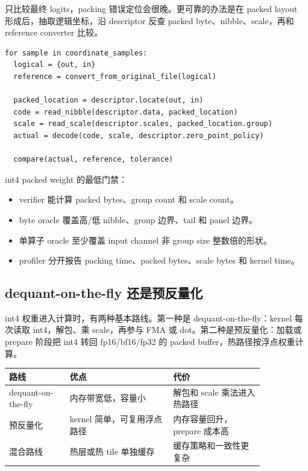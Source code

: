 只比较最终 logits，packing 错误定位会很晚。更可靠的办法是在 packed layout 形成后，抽取逻辑坐标，沿 descriptor 反查 packed byte、nibble、scale，再和 reference converter 比较。

\begin{lstlisting}[numbers=none,caption={packed int4 字节级 oracle}]
for sample in coordinate_samples:
  logical = {out, in}
  reference = convert_from_original_file(logical)

  packed_location = descriptor.locate(out, in)
  code = read_nibble(descriptor.data, packed_location)
  scale = read_scale(descriptor.scales, packed_location.group)
  actual = decode(code, scale, descriptor.zero_point_policy)

  compare(actual, reference, tolerance)
\end{lstlisting}

\begin{rubricbox}
int4 packed weight 的最低门禁：
\begin{itemize}
  \item verifier 能计算 packed bytes、group count 和 scale count。
  \item byte oracle 覆盖高/低 nibble、group 边界、tail 和 panel 边界。
  \item 单算子 oracle 至少覆盖 input channel 非 group size 整数倍的形状。
  \item profiler 分开报告 packing time、packed bytes、scale bytes 和 kernel time。
\end{itemize}
\end{rubricbox}

\subsection{dequant-on-the-fly 还是预反量化}

int4 权重进入计算时，有两种基本路线。第一种是 dequant-on-the-fly：kernel 每次读取 int4，解包、乘 scale，再参与 FMA 或 dot。第二种是预反量化：加载或 prepare 阶段把 int4 转回 fp16/bf16/fp32 的 packed buffer，热路径按浮点权重计算。

\begin{center}
\begin{tabular}{p{0.20\linewidth}p{0.34\linewidth}p{0.30\linewidth}}
\toprule
路线 & 优点 & 代价 \\
\midrule
dequant-on-the-fly & 内存带宽低，容量小 & 解包和 scale 乘法进入热路径 \\
预反量化 & kernel 简单，可复用浮点路径 & 内存容量回升，prepare 成本高 \\
混合路线 & 热层或热 tile 单独缓存 & 缓存策略和一致性更复杂 \\
\bottomrule
\end{tabular}
\end{center}


